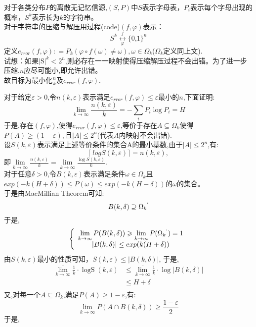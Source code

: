 	\begin{prob} 
		\mbox{}\par
		\noindent 对于各类分布$P$的离散无记忆信源,$(S,P)$中$S$表示字母表，$P_i$表示每个字母出现的概率，$S^k$表示长为$k$的字符串。\\
		对于字符串的压缩与解压用过程(code)$(f,\varphi)$表示：\\
		$${S^k}\underset{\varphi }{\overset{f}{\longleftrightarrow}}{{\text{\{ 0,1\} }}^n}$$
		定义${e_{rror}}(f,\varphi ): = {P_k}(\varphi  \circ f(\omega ) \ne \omega ),\omega  \in {\Omega _k}$($\Omega_k$定义同上文).\\
		试想：如果${\text{|S}}{{\text{|}}^k} < {2^n}$,则必存在一一映射使得压缩解压过程不会出错。为了进一步压缩,$n$应尽可能小,即允许出错。\\
		故目标为最小化$\frac{n}{k}$及${e_{rror}}(f,\varphi )$.\\
		\sol
		\mbox{}\par
		\noindent 对于给定$\varepsilon>0$,令$n(k,\varepsilon)$表示满足$e_{rror}(f,\varphi)\le \varepsilon$最小的$n$,下面证明:
		\[\mathop {\lim }\limits_{k \to \infty } \frac{{n(k,\varepsilon )}}{k} =  - \sum\limits_i {{P_i}\log {P_i}}=H \]
		于是,存在$(f,\varphi)$,使得$e_{rror}(f,\varphi) \le \varepsilon$,等价于存在$A  \subseteq \Omega_k$使得$P(A)\geqslant (1-\varepsilon),$且$|A| \le 2^n$(代表$A$内映射不会出错).\\
		设$S(k,\varepsilon)$表示满足上述等价条件的集合A的最小基数,由于$|A| \le  2^n$,有:\\
		$$\biggl\lceil\ logS(k,\varepsilon)\biggr\rceil =n(k,\varepsilon),$$
		即$\mathop {\lim }\limits_{k \to \infty } \frac{{n(k,\varepsilon )}}{k} = \mathop {\lim }\limits_{k \to \infty } \frac{{\log S(k,\varepsilon )}}{k}$.\\
		对于任意$\delta>0$,令$B(k,\varepsilon)$表示满足条件$\omega \in \Omega_k$且$exp(-k(H+\delta))\le P(\omega) \le exp(-k(H-\delta))$的$\omega$的集合。\\
		于是由MacMillian Theorem可知:
		$$B(k,\delta ) \supseteq {\Omega _k}^`$$
		于是,
		$$\left\{ {\begin{array}{*{20}{c}}
			{\mathop {\lim }\limits_{k \to \infty } P(B(k,\delta )) \geqslant \mathop {\lim }\limits_{k \to \infty } P({\Omega _k}^`) = 1} \\
			{|B(k,\delta )| \le exp(k(H+\delta))} \\
		 \end{array}} \right.$$
		 由$S(k,\varepsilon)$最小的性质可知，$S(k,\varepsilon ) \leqslant |B(k,\delta )|$,
		 于是,
		 \begin{align*}  
            \overline {\mathop {\lim }\limits_{k \to \infty } } \frac{1}{k} \cdot \operatorname{logS} (k,\varepsilon ) &\leqslant \overline {\mathop {\lim }\limits_{k \to \infty } } \frac{1}{k} \cdot \log |B(k,\delta )| \\  
            &\leqslant H+\delta  \\  
        \end{align*}
		又,对每一个$A \subseteq \Omega_k$,满足$P(A) \geqslant 1-\varepsilon$,有:\\
		$$\mathop {\lim }\limits_{k \to \infty } P(A \cap B(k,\delta )) \geqslant \frac{{1 - \varepsilon }}{2}$$
		于是,


\end{prob}
